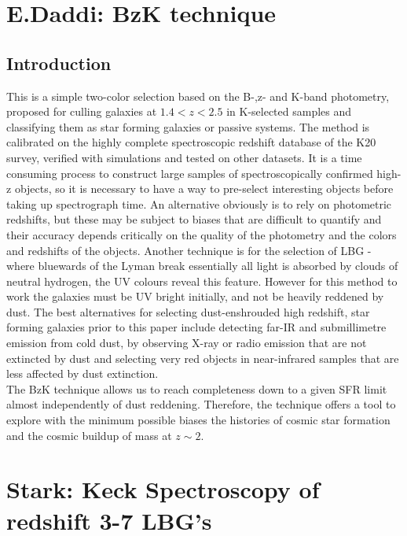 \documentclass{literature}
\begin{document}
\section{E.Daddi: BzK technique}
\subsection{Introduction}
This is a simple two-color selection based on the B-,z- and K-band photometry, proposed for culling galaxies at $1.4< z <2.5$ in K-selected samples and classifying them as star forming galaxies or passive systems. The method is calibrated on the highly complete spectroscopic redshift database of the K20 survey, verified with simulations and tested on other datasets. It is a time consuming process to construct large samples of spectroscopically confirmed high-z objects, so it is necessary to have a way to pre-select interesting objects before taking up spectrograph time. An alternative obviously is to rely on photometric redshifts, but these may be subject to biases that are difficult to quantify and their accuracy depends critically on the quality of the photometry and the colors and redshifts of the objects. Another technique is for the selection of LBG - where bluewards of the Lyman break essentially all light is absorbed by clouds of neutral hydrogen, the UV colours reveal this feature. However for this method to work the galaxies must be UV bright initially, and not be heavily reddened by dust. The best alternatives for selecting dust-enshrouded high redshift, star forming galaxies prior to this paper include detecting far-IR and submillimetre emission from cold dust, by observing X-ray or radio emission that are not extincted by dust and selecting very red objects in near-infrared samples that are less affected by dust extinction. \\ 
The BzK technique allows us to reach completeness down to a given SFR limit almost independently of dust reddening. Therefore, the technique offers a tool to explore with the minimum possible biases the histories of cosmic star formation and the cosmic buildup of mass at $z\sim 2$.


\section{Stark: Keck Spectroscopy of redshift 3-7 LBG's}
\end{document}
